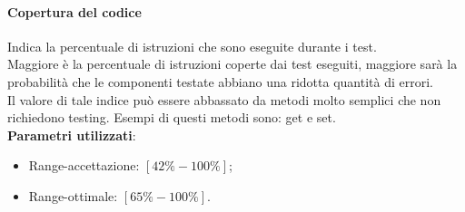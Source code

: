 \paragraph{Copertura del codice}
Indica la percentuale di istruzioni che sono eseguite durante i test.\\
Maggiore è la percentuale di istruzioni coperte dai test eseguiti, maggiore sarà la probabilità che le componenti testate abbiano una ridotta quantità di errori.\\
Il valore di tale indice può essere abbassato da metodi molto semplici che non richiedono testing. Esempi di questi metodi sono: get e set.\\
\textbf{Parametri utilizzati}:
\begin{itemize}
\item Range-accettazione: $[42\%-100\%]$;
\item Range-ottimale: $[65\%-100\%]$.
\end{itemize}